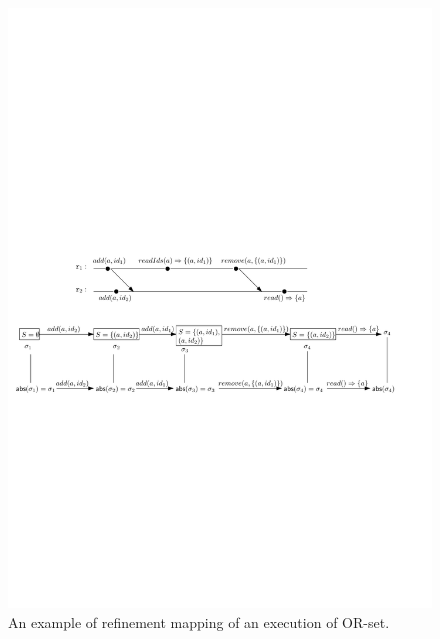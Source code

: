 \begin{figure}[t]
  \centering
  \includegraphics[width=0.85 \textwidth]{figures/RefinementMappingORSet.pdf}
\vspace{-10pt}
  \caption{An example of refinement mapping of an execution of OR-set.}
  \label{fig:an example of refinement mapping of an execution of or-set}
\end{figure}

